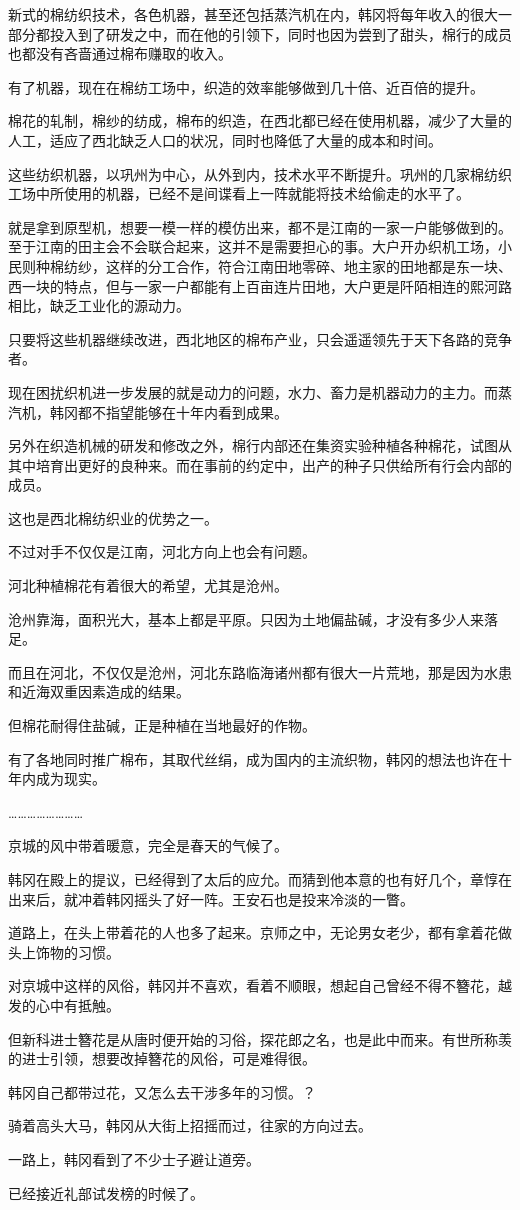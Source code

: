 新式的棉纺织技术，各色机器，甚至还包括蒸汽机在内，韩冈将每年收入的很大一部分都投入到了研发之中，而在他的引领下，同时也因为尝到了甜头，棉行的成员也都没有吝啬通过棉布赚取的收入。

有了机器，现在在棉纺工场中，织造的效率能够做到几十倍、近百倍的提升。

棉花的轧制，棉纱的纺成，棉布的织造，在西北都已经在使用机器，减少了大量的人工，适应了西北缺乏人口的状况，同时也降低了大量的成本和时间。

这些纺织机器，以巩州为中心，从外到内，技术水平不断提升。巩州的几家棉纺织工场中所使用的机器，已经不是间谍看上一阵就能将技术给偷走的水平了。

就是拿到原型机，想要一模一样的模仿出来，都不是江南的一家一户能够做到的。至于江南的田主会不会联合起来，这并不是需要担心的事。大户开办织机工场，小民则种棉纺纱，这样的分工合作，符合江南田地零碎、地主家的田地都是东一块、西一块的特点，但与一家一户都能有上百亩连片田地，大户更是阡陌相连的熙河路相比，缺乏工业化的源动力。

只要将这些机器继续改进，西北地区的棉布产业，只会遥遥领先于天下各路的竞争者。

现在困扰织机进一步发展的就是动力的问题，水力、畜力是机器动力的主力。而蒸汽机，韩冈都不指望能够在十年内看到成果。

另外在织造机械的研发和修改之外，棉行内部还在集资实验种植各种棉花，试图从其中培育出更好的良种来。而在事前的约定中，出产的种子只供给所有行会内部的成员。

这也是西北棉纺织业的优势之一。

不过对手不仅仅是江南，河北方向上也会有问题。

河北种植棉花有着很大的希望，尤其是沧州。

沧州靠海，面积光大，基本上都是平原。只因为土地偏盐碱，才没有多少人来落足。

而且在河北，不仅仅是沧州，河北东路临海诸州都有很大一片荒地，那是因为水患和近海双重因素造成的结果。

但棉花耐得住盐碱，正是种植在当地最好的作物。

有了各地同时推广棉布，其取代丝绢，成为国内的主流织物，韩冈的想法也许在十年内成为现实。

……………………

京城的风中带着暖意，完全是春天的气候了。

韩冈在殿上的提议，已经得到了太后的应允。而猜到他本意的也有好几个，章惇在出来后，就冲着韩冈摇头了好一阵。王安石也是投来冷淡的一瞥。

道路上，在头上带着花的人也多了起来。京师之中，无论男女老少，都有拿着花做头上饰物的习惯。

对京城中这样的风俗，韩冈并不喜欢，看着不顺眼，想起自己曾经不得不簪花，越发的心中有抵触。

但新科进士簪花是从唐时便开始的习俗，探花郎之名，也是此中而来。有世所称羡的进士引领，想要改掉簪花的风俗，可是难得很。

韩冈自己都带过花，又怎么去干涉多年的习惯。？

骑着高头大马，韩冈从大街上招摇而过，往家的方向过去。

一路上，韩冈看到了不少士子避让道旁。

已经接近礼部试发榜的时候了。
